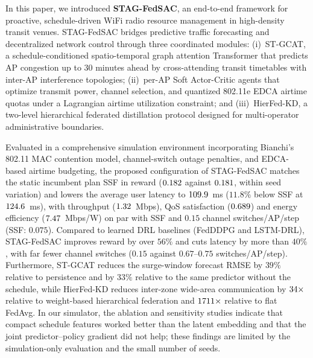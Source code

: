 In this paper, we introduced \textbf{STAG-FedSAC}, an end-to-end framework for proactive, schedule-driven WiFi radio resource management in high-density transit venues. STAG-FedSAC bridges predictive traffic forecasting and decentralized network control through three coordinated modules: (i)~ST-GCAT, a schedule-conditioned spatio-temporal graph attention Transformer that predicts AP congestion up to 30 minutes ahead by cross-attending transit timetables with inter-AP interference topologies; (ii)~per-AP Soft Actor-Critic agents that optimize transmit power, channel selection, and quantized 802.11e EDCA airtime quotas under a Lagrangian airtime utilization constraint; and (iii)~HierFed-KD, a two-level hierarchical federated distillation protocol designed for multi-operator administrative boundaries.

Evaluated in a comprehensive simulation environment incorporating Bianchi's 802.11 MAC contention model, channel-switch outage penalties, and EDCA-based airtime budgeting, the proposed configuration of STAG-FedSAC matches the static incumbent plan SSF in reward ($0.182$ against $0.181$, within seed variation) and lowers the average user latency to $109.9$~ms ($11.8\%$ below SSF at $124.6$~ms), with throughput ($1.32$~Mbps), QoS satisfaction ($0.689$) and energy efficiency ($7.47$~Mbps/W) on par with SSF and $0.15$ channel switches/AP/step (SSF: $0.075$). Compared to learned DRL baselines (FedDDPG and LSTM-DRL), STAG-FedSAC improves reward by over $56\%$ and cuts latency by more than $40\%$, with far fewer channel switches ($0.15$ against $0.67$--$0.75$ switches/AP/step). Furthermore, ST-GCAT reduces the surge-window forecast RMSE by $39\%$ relative to persistence and by $33\%$ relative to the same predictor without the schedule, while HierFed-KD reduces inter-zone wide-area communication by $34\times$ relative to weight-based hierarchical federation and $1711\times$ relative to flat FedAvg. In our simulator, the ablation and sensitivity studies indicate that compact schedule features worked better than the latent embedding and that the joint predictor--policy gradient did not help; these findings are limited by the simulation-only evaluation and the small number of seeds.
